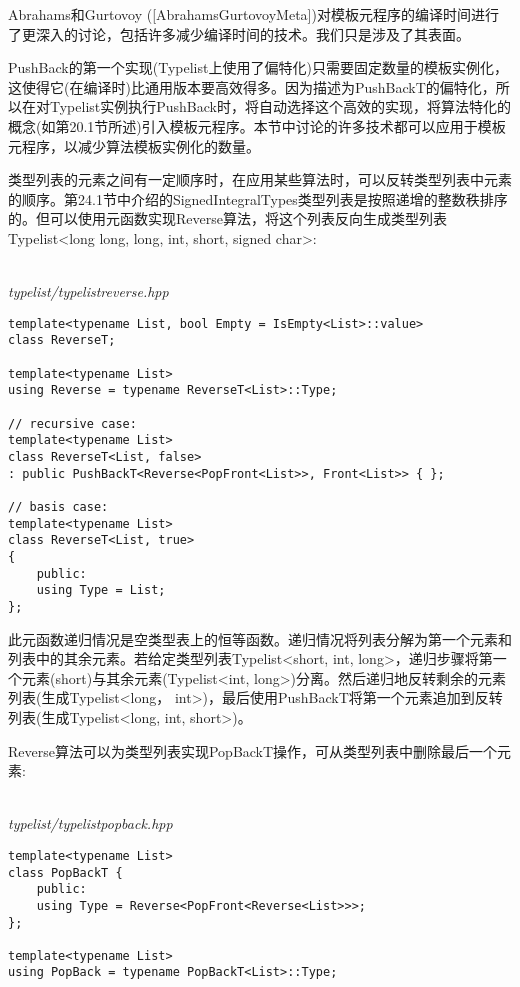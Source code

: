 \begin{tcolorbox}[colback=webgreen!5!white,colframe=webgreen!75!black]
\hspace*{0.75cm}Abrahams和Gurtovoy ([AbrahamsGurtovoyMeta])对模板元程序的编译时间进行了更深入的讨论，包括许多减少编译时间的技术。我们只是涉及了其表面。
\end{tcolorbox}

PushBack的第一个实现(Typelist上使用了偏特化)只需要固定数量的模板实例化，这使得它(在编译时)比通用版本要高效得多。因为描述为PushBackT的偏特化，所以在对Typelist实例执行PushBack时，将自动选择这个高效的实现，将算法特化的概念(如第20.1节所述)引入模板元程序。本节中讨论的许多技术都可以应用于模板元程序，以减少算法模板实例化的数量。


类型列表的元素之间有一定顺序时，在应用某些算法时，可以反转类型列表中元素的顺序。第24.1节中介绍的SignedIntegralTypes类型列表是按照递增的整数秩排序的。但可以使用元函数实现Reverse算法，将这个列表反向生成类型列表Typelist<long long, long, int, short, signed char>:

\hspace*{\fill} \\ %
\noindent
\textit{typelist/typelistreverse.hpp}
\begin{lstlisting}[style=styleCXX]
template<typename List, bool Empty = IsEmpty<List>::value>
class ReverseT;

template<typename List>
using Reverse = typename ReverseT<List>::Type;

// recursive case:
template<typename List>
class ReverseT<List, false>
: public PushBackT<Reverse<PopFront<List>>, Front<List>> { };

// basis case:
template<typename List>
class ReverseT<List, true>
{
	public:
	using Type = List;
};
\end{lstlisting}

此元函数递归情况是空类型表上的恒等函数。递归情况将列表分解为第一个元素和列表中的其余元素。若给定类型列表Typelist<short, int, long>，递归步骤将第一个元素(short)与其余元素(Typelist<int, long>)分离。然后递归地反转剩余的元素列表(生成Typelist<long， int>)，最后使用PushBackT将第一个元素追加到反转列表(生成Typelist<long, int, short>)。

Reverse算法可以为类型列表实现PopBackT操作，可从类型列表中删除最后一个元素:

\hspace*{\fill} \\ %
\noindent
\textit{typelist/typelistpopback.hpp}
\begin{lstlisting}[style=styleCXX]
template<typename List>
class PopBackT {
	public:
	using Type = Reverse<PopFront<Reverse<List>>>;
};

template<typename List>
using PopBack = typename PopBackT<List>::Type;
\end{lstlisting}

